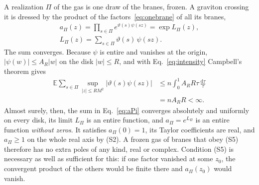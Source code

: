 \documentclass[a4paper,11pt]{article}
\newcommand{\bE}{\mathbb{E}}
\newcommand{\dd}{\mathrm{d}}
\begin{document}
A realization $\Pi$ of the gas is one draw of the branes, frozen. A graviton crossing it is dressed by the product of the factors~\eqref{eq:onebrane} of all its branes,
\begin{equation}
\label{eq:aPi}
\begin{gathered}
a_\Pi(z)=\prod_{s\in\Pi}e^{\vartheta(s)\psi(sz)}=\exp L_\Pi(z),\\
L_\Pi(z)=\sum_{s\in\Pi}\vartheta(s)\,\psi(sz).
\end{gathered}
\end{equation}
The sum converges. Because $\psi$ is entire and vanishes at the origin, $|\psi(w)|\le A_R|w|$ on the disk $|w|\le R$, and with Eq.~\eqref{eq:intensity} Campbell's theorem gives
\[
\begin{aligned}
\bE\sum_{s\in\Pi}\sup_{|z|\le RM^2}\bigl|\vartheta(s)\psi(sz)\bigr|&\le n\int_0^1A_RR\tau\,\frac{\dd\tau}\tau\\
&=nA_RR<\infty .
\end{aligned}
\]
Almost surely, then, the sum in Eq.~\eqref{eq:aPi} converges absolutely and uniformly on every disk, its limit $L_\Pi$ is an entire function, and $a_\Pi=e^{L_\Pi}$ is an entire function \emph{without zeros}. It satisfies $a_\Pi(0)=1$, its Taylor coefficients are real, and $a_\Pi\ge1$ on the whole real axis by (S2). A frozen gas of branes that obey (S5) therefore has no extra poles of any kind, real or complex. Condition (S5) is necessary as well as sufficient for this: if one factor vanished at some $z_0$, the convergent product of the others would be finite there and $a_\Pi(z_0)$ would vanish.
\end{document}
